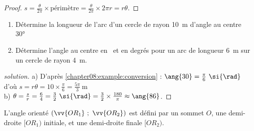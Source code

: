 \documentclass[main.tex]{subfiles}
\begin{document}
\begin{proof} $s=\tfrac{\theta}{2\pi}\times \text{périmètre}=\tfrac{\theta}{2\pi}\times 2\pi r=r\theta$.
\end{proof}
\begin{example} \hfill 
\begin{enumerate}[label=\alph*),leftmargin=*]
	\item Détermine la longueur de l'arc d'un cercle de rayon \SI{10}{\meter} d'angle au centre \ang{30}
	\item Détermine l'angle au centre en~\si{\rad} et en degrés pour un arc   de longueur \SI{6}{\meter} sur un cercle de rayon \SI{4}{\meter}.
\end{enumerate} 
\end{example}
\begin{proof}[solution]  a) D'après \ref{chapter08:example:conversion} :  $\ang{30}=\tfrac{\pi}{6}~\si{\rad}$ d'où $s=r\theta=10\times \tfrac{\pi}{6}= \tfrac{5\pi}{3}~\si{\meter}$\\
	b) $\theta=\tfrac{s}{r}=\tfrac{6}{4}=\frac{3}{2}~\si{\rad}=\tfrac{3}{2}\times \tfrac{180}{\pi}\approx \ang{86} $.
\end{proof}
\begin{definition}
\begin{marginfigure}%
	\centering
{}
\caption{Angle orienté $(\protect\vv{OA}~;~\protect\vv{OB})$ avec une mesure positive ou négative}
\end{marginfigure}
 L'angle orienté $(\vv{OR_1}~;~\vv{OR_2})$ est défini par un sommet $O$, une demi-droite $[OR_1)$ initiale, et une demi-droite finale $[OR_2)$. 
\end{definition}  
\end{document}
